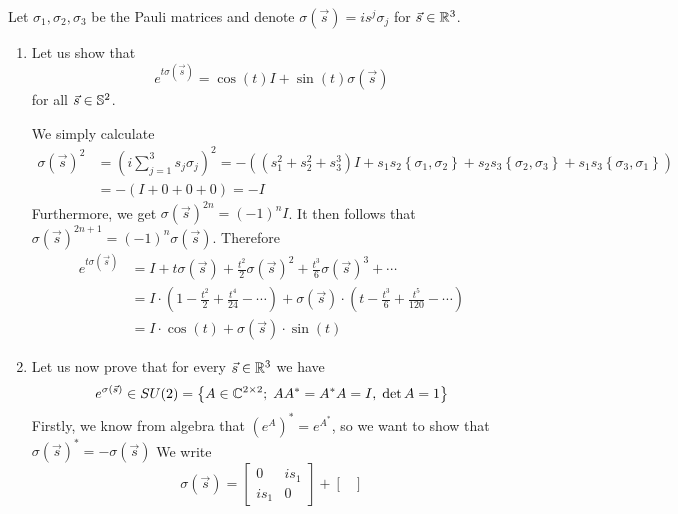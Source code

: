 \documentclass[a4paper, 12pt]{article}
\begin{document}
\begin{Exercise}
    Let $\sigma_1, \sigma_2, \sigma_3$ be the Pauli matrices and denote $\sigma(\vec{s}) = is^j\sigma_j$ for $\vec{s} \in \R^3$.
    \begin{enumerate}[label=(\roman*)]
        \item Let us show that
            \[
                e^{t\sigma(\vec{s})} = \cos(t)I + \sin(t)\sigma(\vec{s})
            \]
            for all $\vec{s} \in \S^2$.

            We simply calculate
            \begin{align*}
                \sigma(\vec{s})^2
                &= \left( i \sum_{j=1}^{3}s_j\sigma_j \right)^2
                = -\left( (s_1^2 + s_2^2 + s_3^3)I + s_1s_2\left\{ \sigma_1,\sigma_2 \right\} + s_2s_3\left\{ \sigma_2,\sigma_3 \right\} + s_1s_3\left\{ \sigma_3,\sigma_1 \right\} \right) \\
                &= -(I + 0 + 0 + 0) = -I
            \end{align*}
            Furthermore, we get $\sigma(\vec{s})^{2n} = (-1)^nI$.
            It then follows that $\sigma(\vec{s})^{2n+1} = (-1)^n\sigma(\vec{s})$.
            Therefore
            \begin{align*}
                e^{t\sigma(\vec{s})}
                &= I + t\sigma(\vec{s}) + \frac{t^2}{2}\sigma(\vec{s})^2 + \frac{t^3}{6}\sigma(\vec{s})^3 + \cdots \\
                &= I\cdot\left( 1 - \frac{t^2}{2} + \frac{t^4}{24} - \cdots \right) + \sigma(\vec{s}) \cdot \left( t - \frac{t^3}{6} + \frac{t^5}{120} - \cdots \right) \\
                &= I \cdot \cos(t) + \sigma(\vec{s}) \cdot \sin(t)
            \end{align*}
        \item Let us now prove that for every $\vec{s} \in \R^3$ we have
            \[
                e^{\sigma(\vec{s})} \in SU(2) = \left\{ A \in \C^{2\times 2} ; \; AA^* = A^*A = I, \; \det A = 1 \right\}
            \]
            Firstly, we know from algebra that $(e^{A})^* = e^{A^*}$,
            so we want to show that $\sigma(\vec{s})^* = -\sigma(\vec{s})$
            We write
            \[
                \sigma(\vec{s}) =
                \begin{bmatrix}
                    0 & is_1 \\
                    is_1 & 0
                \end{bmatrix}
                +
                \begin{bmatrix}

\end{bmatrix}\]
\end{enumerate}
\end{Exercise}
\end{document}
